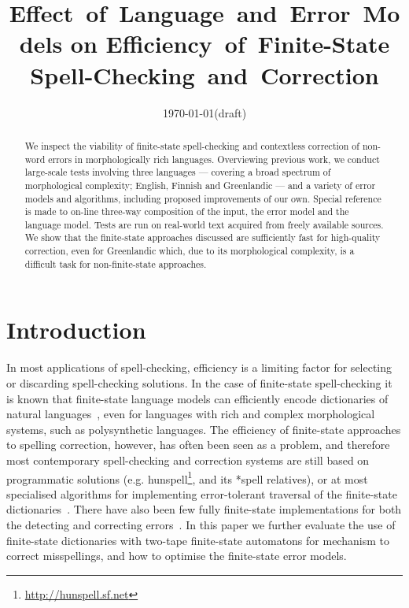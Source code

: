 \documentclass[11pt]{article}
\title{Effect~of~Language~and~Error~Models on Efficiency~of~Finite-State
Spell-Checking~and~Correction}
\author{
}
\date{\today (draft)}
\begin{document}
\maketitle \begin{abstract} We inspect the viability of finite-state
spell-checking and contextless correction of non-word errors in morphologically
rich languages. Overviewing previous
work, we conduct large-scale tests involving three languages
--- covering a broad spectrum of morphological complexity;
English, Finnish and Greenlandic --- and a variety of
error models and algorithms, including proposed
improvements of our own. Special reference is made to on-line
three-way composition of the input, the error model and the language model.
Tests are run on real-world text acquired from
freely available sources.
We show that the finite-state approaches discussed are sufficiently fast
for high-quality correction, even for Greenlandic which, due to its morphological
complexity, is a difficult task for non-finite-state approaches.
\end{abstract}

\section{Introduction}
\label{sec:introduction}

In most applications of spell-checking, efficiency is a limiting factor for
selecting or discarding spell-checking solutions. In the case of finite-state
spell-checking it is known that finite-state language
models can efficiently encode dictionaries of natural
languages~\cite{beesley/2003}, even for languages with rich and complex
morphological systems, such as polysynthetic languages. The efficiency of
finite-state approaches to spelling correction, however, has often been seen as
a problem, and therefore most contemporary spell-checking and correction
systems are still based on programmatic solutions (e.g.
hunspell\footnote{\url{http://hunspell.sf.net}}, and its *spell relatives), or
at most specialised algorithms for implementing error-tolerant traversal of the
finite-state dictionaries~\cite{oflazer/1996,hulden/2009}. There have also been
few fully finite-state implementations for both the detecting and correcting
errors~\cite{schulz/2002,pirinen/2010/lrec}. In this
paper we further evaluate the use of finite-state dictionaries with two-tape
finite-state automatons for mechanism to correct misspellings, and how to
optimise the finite-state error models.
\end{document}
